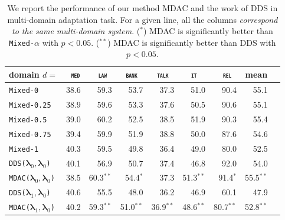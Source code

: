 \documentclass[11pt]{article}
\newcommand{\domain}[1]{\texttt{\textsc{#1}}}
\newcommand{\system}[1]{\texttt{{#1}}}
\newcommand{\vlambda}{\ensuremath{\boldsymbol\lambda}\xspace} %
\begin{document}
\begin{table}[htbp]
  \centering \small
  \begin{tabular}{|l|*8{r|}} \hline
    domain \hfill $d=$ & \multicolumn{1}{c|}{\domain{ med}} & \multicolumn{1}{c|}{\domain{ law}} & \multicolumn{1}{c|}{\domain{bank}} & \multicolumn{1}{c|}{\domain{talk}} & \multicolumn{1}{c|}{\domain{ it }} & \multicolumn{1}{c|}{\domain{ rel}} & \multicolumn{1}{c|}{mean} \\ \hline \hline
    \system{Mixed-0} &38.6&59.3&53.7&37.3&51.0&90.4&55.1\\
    \system{Mixed-0.25}&38.9&59.6&53.3&37.6&50.5&90.6&55.1\\
    \system{Mixed-0.5}&39.0&60.2&52.5&38.5&51.9&90.3&55.4\\
    \system{Mixed-0.75}&39.4&59.9&51.9&38.8&50.0&87.6&54.6\\
    \system{Mixed-1}&40.3&59.5&49.8&36.4&49.0&80.0&52.5\\
    \hline \hline
    \system{DDS($\vlambda_0, \vlambda_0$)} &40.1&56.9&50.7&37.4&46.8&92.0&54.0\\ 
    \system{MDAC($\vlambda_0, \vlambda_0$)}&38.5&60.3$^{**}$&54.4$^*$&37.3&51.3$^{**}$&91.4$^*$&55.5$^{**}$\\ 
    \hline \hline
    \system{DDS($\vlambda_1, \vlambda_0$)} &40.6&55.5&48.0&36.2&46.9&60.1&47.9\\
    \system{MDAC($\vlambda_1, \vlambda_0$)}&40.2&59.3$^{**}$&51.0$^{**}$&36.9$^{**}$&48.6$^{**}$&80.7$^{**}$&52.8$^{**}$\\
    \hline
  \end{tabular}
  \caption{We report the performance of our method MDAC and the work of \citet{Wang20balancing} DDS in multi-domain adaptation task. For a given line, all the columns \emph{correspond to the same multi-domain system}. ($^*$) MDAC is significantly better than \system{Mixed-$\alpha$} with $p<0.05$. ($^{**}$) MDAC is significantly better than DDS with $p<0.05$.}
  \label{tab:multi-da}
\end{table}
\end{document}
